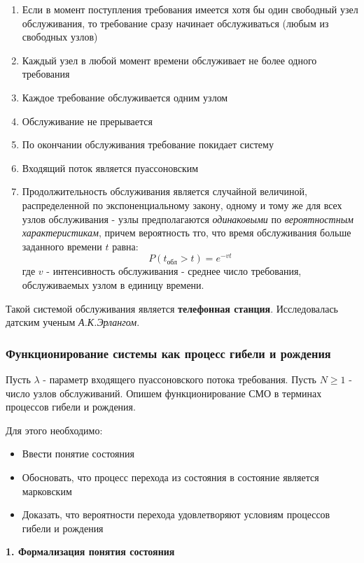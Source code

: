 \documentclass[aps,%
12pt,%
final,%
oneside,
onecolumn,%
musixtex, %
superscriptaddress,%
centertags]{article} %
\theoremstyle{plain}
\theoremstyle{definition}
\theoremstyle{remark}
\begin{document}
\begin{enumerate}
	\item Если в момент поступления требования имеется хотя бы один свободный узел обслуживания, то требование сразу начинает обслуживаться (любым из свободных узлов)
	\item Каждый узел в любой момент времени обслуживает не более одного требования
	\item Каждое требование обслуживается одним узлом 
	\item Обслуживание не прерывается
	\item По окончании обслуживания требование покидает систему
	\item Входящий поток является пуассоновским
	\item Продолжительность обслуживания является случайной величиной, распределенной по экспоненциальному закону, одному и тому же для всех узлов обслуживания - узлы предполагаются \textit{одинаковыми} по \textit{вероятностным характеристикам}, причем вероятность тго, что время обслуживания больше заданного времени $t$ равна:
	$$P(t_{\text{обл}} > t) = e^{-vt}$$
	где $v$ - интенсивность обслуживания - среднее число требования, обслуживаемых узлом в единицу времени.
\end{enumerate}

Такой системой обслуживания является \textbf{телефонная станция}. Исследовалась датским ученым \textit{А.К.Эрлангом}.

\subsubsection{Функционирование системы как процесс гибели и рождения}

Пусть $\lambda$ - параметр входящего пуассоновского потока требования. Пусть $N \geq 1$ - число узлов обслуживаний. Опишем функционирование СМО в терминах процессов гибели и рождения.

Для этого необходимо:

\begin{itemize}
	\item Ввести понятие состояния
	\item Обосновать, что процесс перехода из состояния в состояние является марковским 
	\item Доказать, что вероятности перехода удовлетворяют условиям процессов гибели и рождения
\end{itemize}

\textbf{1. Формализация понятия состояния}
\end{document}
